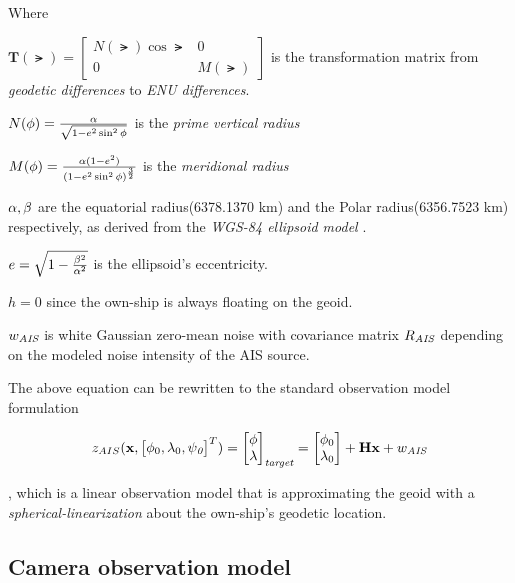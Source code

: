 Where

\begin{description}
	\item $\mathbf{T}(\lat)=
	\begin{bmatrix}
	N(\lat)\cos\lat &0\\
	0 &M(\lat)
	\end{bmatrix}
	$ is the transformation matrix from \emph{geodetic differences} to \emph{ENU differences}.
	\item $N({\phi}) = \frac{{\alpha}}{\sqrt{1-e^2\sin^2{\phi}}}$ is the \emph{prime vertical radius}
	\item $M({\phi}) = \frac{{\alpha}(1-e^2)}{(1-e^2\sin^2{\phi})^\frac{3}{2}}$ is the \emph{meridional radius}
	\item ${\alpha},{\beta}$ are the equatorial radius(6378.1370 km) and the Polar radius(6356.7523 km) respectively, as derived from the \emph{WGS-84 ellipsoid model} \cite{Farrell2008}.
	\item $e = \sqrt{1 -\frac{{\beta}^2}{{\alpha}^2}}$ is the ellipsoid's eccentricity.
	\item $h = 0 $ since the own-ship is always floating on the geoid.
	\item ${w}_{\textit{AIS}}$ is white Gaussian zero-mean noise with covariance matrix ${R}_{\textit{AIS}}$ depending on the modeled noise intensity of the AIS source.
\end{description}

The above equation can be rewritten to the standard observation model formulation

\begin{equation}
z_{AIS}(\mathbf{x},\begin{bmatrix}{\phi}_{0}, {\lambda}_{0}, {\psi}_{\textit{0}} \end{bmatrix}^{T}) = \begin{bmatrix}
{\phi}\\ {\lambda}
\end{bmatrix}_{\textit{target}} = \begin{bmatrix}
{\phi}_{0}\\ {\lambda}_{0}
\end{bmatrix} + \mathbf{H}\mathbf{x} + {w}_{\textit{AIS}}
\end{equation}

, which is a linear observation model that is approximating the geoid with a \emph{spherical-linearization} about the own-ship's geodetic location.

\subsection{Camera observation model}


